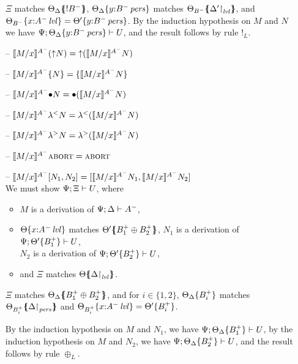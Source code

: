 \begin{itemize}
  $\Xi$ matches $\frameoff{\Theta_{\Delta}}{{!}B^-}$,
  $\tackon{\Theta_{\Delta}}{y{:}\ispers{B^-}}$ matches 
  $\frameoff{\Theta_{B^-}}{\restrictto{\Delta'}{\mlvl}}$,
  and 
  $\tackon{\Theta_{B^-}}{x{:}\islvl{A^-}} = \tackon{\Theta'}{y{:}\ispers{B^-}}$.
  By the induction hypothesis on $M$ and $N$ we have
  $\foc{\Psi}{\tackon{\Theta_{\Delta}}{y{:}\ispers{B^-}}}{U}$, and the result
  follows by rule ${!}_L$.

  \smallskip

\item[--] $\rsubsta{M}{x}{(\tupr{N})}{A^-} 
           = \tupr{(\rsubsta{M}{x}{N}{A^-})}$
\item[--] $\rsubsta{M}{x}{\tlaxr{N}}{A^-} 
           = \tlaxr{\rsubsta{M}{x}{N}{A^-}}$

\item[--] $\rsubsta{M}{x}{\tfusel{N}}{A^-} 
           = \tfusel{(\rsubsta{M}{x}{N}{A^-})}$
\item[--] $\rsubsta{M}{x}{\tlaml{N}}{A^-} 
           = \tlaml{(\rsubsta{M}{x}{N}{A^-})}$
\item[--] $\rsubsta{M}{x}{\tlamr{N}}{A^-} 
           = \tlamr{(\rsubsta{M}{x}{N}{A^-})}$
\item[--] $\rsubsta{M}{x}{\tabort}{A^-} 
           = \tabort$
\item[--] $\rsubsta{M}{x}{\toplusl{N_1}{N_2}}{A^-} 
           = \toplusl{\rsubsta{M}{x}{N_1}{A^-}}{\rsubsta{M}{x}{N_2}{A^-}}$
  \smallskip\\
  We must show $\foc{\Psi}{\Xi}{U}$, where 
  \begin{itemize}
  \item $M$ is a derivation of $\foc{\Psi}{\Delta}{A^-}$, 
  \item $\tackon{\Theta}{x{:}\islvl{A^-}}$ matches 
     $\frameoff{\Theta'}{B_1^+ \oplus B_2^+}$, $N_1$ is a derivation of 
     $\foc{\Psi}{\tackon{\Theta'}{B_1^+}}{U}$,\\
     $N_2$ is a derivation of $\foc{\Psi}{\tackon{\Theta'}{B_2^+}}{U}$,
  \item and $\Xi$ matches $\frameoff{\Theta}{\restrictto{\Delta}{\mlvl}}$.
  \end{itemize}

  $\Xi$ matches $\frameoff{\Theta_{\Delta}}{B_1^+ \oplus B_2^+}$,
  and for $i \in \{1,2\}$,
  $\tackon{\Theta_{\Delta}}{B_i^+}$ matches
  $\frameoff{\Theta_{B_i^+}}{\restrictto{\Delta}{\mpers}}$ 
  and
  $\tackon{\Theta_{B_i^+}}{x{:}\islvl{A^-}} =
   \tackon{\Theta'}{B_i^+}$.

  By the induction hypothesis on $M$ and $N_1$, we have
  $\foc{\Psi}{\tackon{\Theta_{\Delta}}{B_1^+}}{U}$, by the induction 
  hypothesis on $M$ and $N_2$, we have 
  $\foc{\Psi}{\tackon{\Theta_{\Delta}}{B_2^+}}{U}$, and the
  result follows by rule $\oplus_L$. 



\end{itemize}
